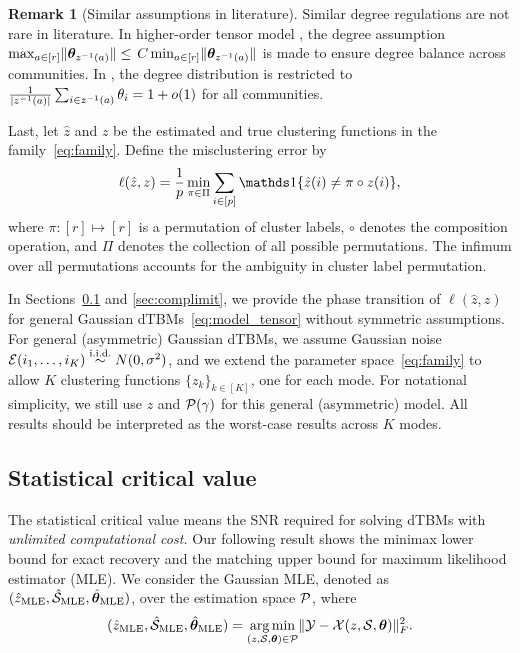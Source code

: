 \documentclass[journal]{IEEEtran}
\theoremstyle{definition}
\theoremstyle{definition}
\newtheorem{rmk}{Remark}
\begin{document}
\begin{rmk}[Similar assumptions in literature]
Similar degree regulations are not rare in literature. In higher-order tensor model \citep{ke2019community}, the degree assumption $\max_{a\in[r]} \lVert\boldsymbol{\theta}_{z^{-1}(a)}\rVert \leq $ $ C \min_{a\in[r]}\lVert\boldsymbol{\theta}_{z^{-1}(a)}\rVert$ is made to ensure degree balance across communities. %
In \cite{gao2018community}, the degree distribution is restricted to ${1\over |z^{-1}(a)|}\sum_{i\in z^{-1}(a)}\theta_i=1+o(1)$ for all communities. 
\end{rmk}

Last, let $\hat z$ and $z$ be the estimated and true clustering functions in the family~\eqref{eq:family}. Define the misclustering error by
\[
\ell(\hat z, z)={1\over p}\min_{\pi \in \Pi}\sum_{i\in[p]}\ind\{\hat z(i)\neq \pi \circ z(i)\},
\]
where $\pi: [r] \mapsto [r]$ is a permutation of cluster labels, $\circ$ denotes the composition operation, and $\Pi$ denotes the collection of all possible permutations. The infimum over all permutations accounts for the ambiguity in cluster label permutation. 

In Sections~\ref{sec:statlimit} and \ref{sec:complimit}, we provide the phase transition of $\ell (\hat z, z)$ for general Gaussian dTBMs~\eqref{eq:model_tensor} without symmetric assumptions. For general (asymmetric) Gaussian dTBMs, we assume Gaussian noise $\mathcal{E}(i_1,\ldots,i_K)\stackrel{\text{i.i.d.}}{\sim} N(0,\sigma^2)$, and we extend the parameter space~\eqref{eq:family} to allow $K$ clustering functions $\{z_k\}_{k\in[K]}$, one for each mode. For notational simplicity, we still use $z$ and $\mathcal{P}(\gamma)$ for this general (asymmetric) model. All results should be interpreted as the worst-case results across $K$ modes. 

\subsection{Statistical critical value}\label{sec:statlimit}
The statistical critical value means the SNR required for solving dTBMs with \emph{unlimited computational cost.}   Our following result shows the minimax lower bound for exact recovery and the matching upper bound for maximum likelihood estimator (MLE).  We consider the Gaussian MLE, denoted as $(\hat z_{\text{MLE}},\hat {\mathcal{S}}_{\text{MLE}},  \hat {\boldsymbol{\theta}}_{\text{MLE}})$, over the estimation space $\mathcal{P}$, where 
\begin{equation}\label{eq:mle}
    (\hat z_{\text{MLE}}, \hat \tS_{\text{MLE}}, \hat \mtheta_{\text{MLE}}) = \argmin_{ (z,\tS,\mtheta) \in \tP} \onormSize{}{\tY - \tX(z,\tS,\mtheta)}_F^2.
\end{equation}
\end{document}
